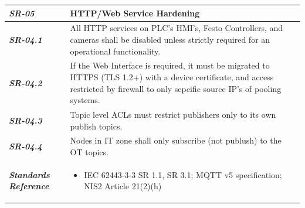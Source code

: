 \begin{tabularx}{\textwidth}{>{\bfseries}p{2.5cm} X}
    \textit{SR-05} & \textbf{HTTP/Web Service Hardening} \vspace{0.5em}\\
\toprule
\textit{SR-04.1} &

    All HTTP services on PLC's HMI's, Festo Controllers, and cameras shall be disabled unless strictly required for an operational functionality.
    \vspace{0.5em}
\\
\textit{SR-04.2} &
    If the Web Interface is required, it must be migrated to HTTPS (TLS 1.2+) with a device certificate, and access restricted by firewall to only sepcific source
    IP's of pooling systems.
    \vspace{0.5em}
    \\
\textit{SR-04.3} &
    Topic level ACLs must restrict publishers only to its own publish topics.
    \vspace{0.5em}
    \\
\textit{SR-04.4} &
    Nodes in IT zone shall only subscribe (not publush) to the OT topics.
    \vspace{0.5em}
    \\
\midrule
    \textit{Standards Reference} &
\begin{itemize}[label=-, noitemsep, topsep=0pt, leftmargin=*]
    \item IEC 62443-3-3 SR 1.1, SR 3.1; MQTT v5 specification; NIS2 Article 21(2)(h)
\end{itemize} \vspace{1em} \\ 
\end{tabularx}
\vspace{2em}

